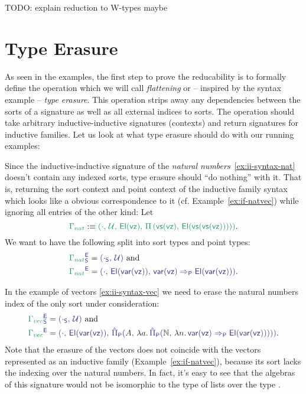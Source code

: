 TODO: explain reduction to W-types maybe

\section{Type Erasure}

As seen in the examples, the first step to prove the reducability is to formally
define the operation which we will call \emph{flattening} or -- inspired by
the syntax example -- \emph{type erasure}.
This operation strips away any dependencies between the sorts of a signature
as well as all external indices to sorts.
The operation should take arbitrary inductive-inductive signatures (contexts) and
return signatures for inductive families.
Let us look at what type erasure should do with our running examples:

\begin{example}\label{ex:red-e-nat}
Since the inductive-inductive signature of the \emph{natural numbers}~\ref{ex:ii-syntax-nat} doesn't
contain any indexed sorts, type erasure should ``do nothing'' with it.
That is, returning the sort context and point context of the inductive family
syntax which looks like a obvious correspondence to it (cf. Example~\ref{ex:if-natvec})
while ignoring all entries of the other kind:
Let
\begin{equation*}
\grm{\Gamma_{nat}} 
  :\equiv \grm{(\cdot,\, \UU,\, \El(\vz),\, \Pi\left(\vs(\vz),\, \El(\vs(\vs(\vz)))\right))}
  \text{.}
\end{equation*}
We want to have the following split into sort types and point types:
\begin{align*}
\tqm{\grm{\Gamma_{nat}}^\EE_\Sc}
 &= \tqm{(\cdot_\Sc,\, \UU)} \text{ and} \\
\tqm{\grm{\Gamma_{nat}}^\EE}
 &= \tqm{(\cdot,\, \El(\var(\vz)),\, \var(\vz) \Rightarrow_\Pc \El(\var(\vz)))} \text{.}
\end{align*}
\end{example}

\begin{example}[Vectors]\label{ex:red-e-vec}
In the example of vectors \ref{ex:ii-syntax-vec} we need to erase the natural numbers
index of the only sort under consideration:
\begin{align*}
\tqm{\grm{\Gamma_{vec}}^\EE_\Sc}
 &= \tqm{(\cdot_\Sc,\, \UU)} \text{ and} \\
\tqm{\grm{\Gamma_{vec}}^\EE}
  &= \tqm{(\cdot,\, \El(\var(\vz)),\, 
    \ExtPiP{A}{\blm{\lambda a.\,}\ExtPiP{\N}{\blm{\lambda n.\,}
    \var(\vz) \Rightarrow_\Pc \El(\var(\vz))}})} \text{.}
\end{align*}
Note that the erasure of the vectors does not coincide with the vectors represented
as an inductive family (Example~\ref{ex:if-natvec}), because its sort lacks the
indexing over the natural numbers.
In fact, it's easy to see that the algebras of this signature would not be isomorphic
to the type of lists over the type .
\end{example}


